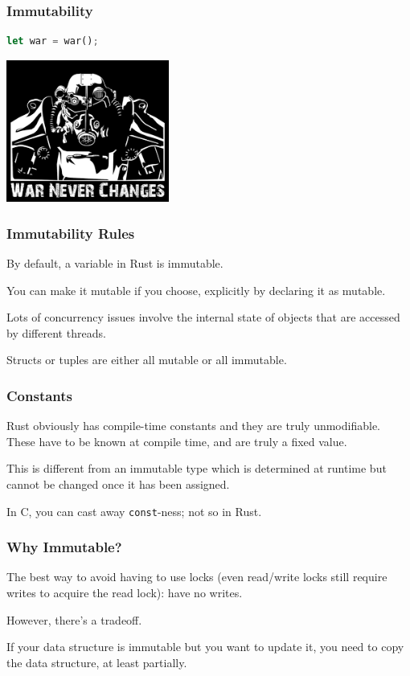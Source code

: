 \begin{frame}[fragile]
\frametitle{Immutability}

\begin{lstlisting}[language=Rust]
let war = war();
\end{lstlisting}

\begin{center}
	\includegraphics[width=0.4\textwidth]{images/fallout.png}
\end{center}

\end{frame}


\begin{frame}
\frametitle{Immutability Rules}

By default, a variable in Rust is immutable. 

You can make it mutable if you choose, explicitly by declaring it as mutable.

Lots of concurrency issues involve the internal state of objects that are accessed by different threads. 

Structs or tuples are either all mutable or all immutable.


\end{frame}

\begin{frame}
\frametitle{Constants}

Rust obviously has compile-time constants and they are truly unmodifiable. These have to be known at compile time, and are truly a fixed value. 

This is different from an immutable type which is determined at runtime but cannot be changed once it has been assigned.

In C, you can cast away {\tt const}-ness; not so in Rust.


\end{frame}



\begin{frame}
\frametitle{Why Immutable?}

The best way to avoid having
to use locks (even read/write locks still require writes to acquire
the read lock): have no writes.  

However, there's a tradeoff. 

If your
data structure is immutable but you want to update it, you need to copy the data structure, at least
partially.


\end{frame}


